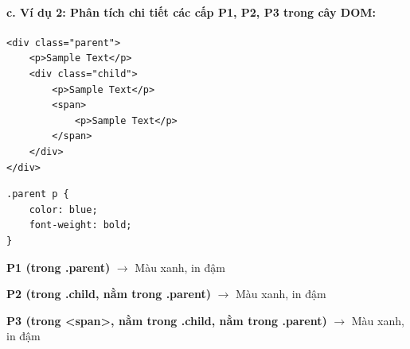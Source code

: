 \paragraph{c. Ví dụ 2: Phân tích chi tiết các cấp P1, P2, P3 trong cây DOM:}
\begin{codeWindow}
\begin{lstlisting}[language=HTML5]
<div class="parent">
    <p>Sample Text</p>
    <div class="child">
        <p>Sample Text</p>
        <span>
            <p>Sample Text</p>
        </span>
    </div>
</div>
\end{lstlisting}

\begin{lstlisting}[language=CSS3]
.parent p {
    color: blue;
    font-weight: bold;
}
\end{lstlisting}
\end{codeWindow}

\begin{browserWindow}
\sffamily\small
\textcolor{primaryBlue}{\textbf{P1 (trong .parent)}} $\rightarrow$ Màu xanh, in đậm \par\vspace{2pt}
\textcolor{primaryBlue}{\textbf{P2 (trong .child, nằm trong .parent)}} $\rightarrow$ Màu xanh, in đậm \par\vspace{2pt}
\textcolor{primaryBlue}{\textbf{P3 (trong <span>, nằm trong .child, nằm trong .parent)}} $\rightarrow$ Màu xanh, in đậm
\end{browserWindow}

